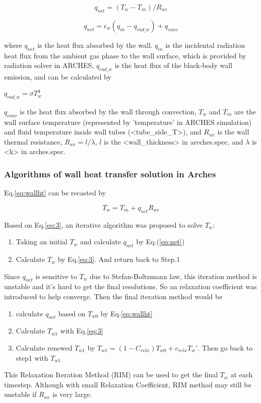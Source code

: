 \begin{equation}
q_{net}=(T_{w}-T_{in})/R_{wc}\label{eq:wallht}
\end{equation}


\begin{equation}
q_{net}=\epsilon_{w}(q_{in}-q_{rad\_w})+q_{conv}\label{eq:net}
\end{equation}


where $q_{net}$ is the heat flux absorbed by the wall. $q_{in}$
is the incidental radiation heat flux from the ambient gas phase to
the wall surface, which is provided by radiation solver in ARCHES,
$q_{rad\_w}$ is the heat flux of the black-body wall emission, and
can be calculated by

$q_{rad\_w}=\sigma T_{w}^{4}$

$q_{conv}$ is the heat flux absorbed by the wall through convection,
$T_w$ and $T_{in}$ are the wall surface temperature (represented
by 'temperature' in ARCHES simulation) and fluid temperature inside
wall tubes (<tube\_side\_T>), and $R_{wc}$ is the wall thermal resistance,
$R_{wc}=l/\lambda$, $l$ is the <wall\_thickness> in areches.spec,
and $\lambda$ is <k> in arches.spec.


\subsubsection{Algorithms of wall heat transfer solution in Arches\label{sec:Algorithms-of-wall}}

Eq.\ref{eq:wallht} can be recasted by

\begin{equation}
T_{w}=T_{in}+q_{net}R_{wc}\label{eq:3}
\end{equation}


Based on Eq.\ref{eq:3}, an iterative algorithm was proposed to solve
$T_w$:
\begin{enumerate}
\item Taking an initial $T_w$ and calculate $q_{net}$ by Eq.(\ref{eq:net}) 
\item Calculate $T_w$ by Eq.\ref{eq:3}. And return back to Step.1
\end{enumerate}
Since $q_{net}$ is sensitive to $T_w$ due to Stefan-Boltzmann law,
this iteration method is unstable and it's hard to get the final resolutions.
So an relaxation coefficient was introduced to help converge. Then
the final iteration method would be
\begin{enumerate}
\item calculate $q_{net}$ based on $T_{w0}$ by Eq.\ref{eq:wallht}
\item Calculate $T_{w1}$ with Eq.\ref{eq:3}
\item Calculate renewed $T_{w1}$ by $T_{w1}=(1-C_{relx})T_{w0}+c_{relx}T_w'$.
Then go back to step1 with $T_{w1}$
\end{enumerate}
This Relaxation Iteration Method (RIM) can be used to get the final
$T_w$ at each timestep. Although with small Relaxation Coefficient,
RIM method may still be unstable if $R_{wc}$ is very large.

